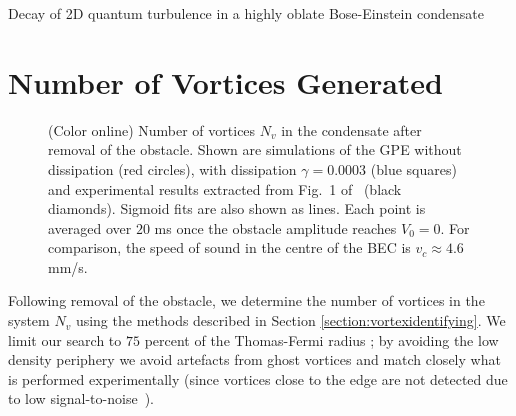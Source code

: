 \begin{chapter}{\label{cha:shin}Decay of 2D quantum turbulence in a highly oblate Bose-Einstein condensate}
\section{Number of Vortices Generated}
\begin{figure}
\begin{center}
\end{center}
\caption{\label{fig:N_vV} (Color online) Number of vortices $N_v$ in the condensate after removal of the obstacle. Shown are simulations of the GPE without dissipation (red circles), with dissipation $\gamma = 0.0003$ (blue squares) and experimental results extracted from Fig.~1 of~\citep{kwon_moon_14} (black diamonds). Sigmoid fits are also shown as lines. Each point is averaged over $20$ ms once the obstacle amplitude reaches $V_0=0$.  For comparison, the speed of sound in the centre of the BEC is $v_c\approx 4.6$ mm/s.  }
\end{figure} 
Following removal of the obstacle, we determine the number of vortices in the system $N_v$ using the methods described in Section \ref{section:vortexidentifying}.  
We limit our search to $75$ percent of the Thomas-Fermi radius ; by avoiding the low density periphery we avoid artefacts from ghost vortices and match closely what is performed experimentally (since vortices close to the edge are not detected due to low signal-to-noise~\citep{shin_private}). 


\end{chapter}
